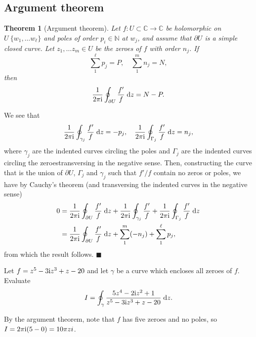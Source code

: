 \documentclass[letter-paper]{tufte-book}
\newtheorem{theorem}{\color{pastel-blue}Theorem}[section]
\newenvironment{proof}[1][Proof]{\begin{trivlist}
\item[\hskip \labelsep {\bfseries #1}]}{\end{trivlist}}
\newenvironment{example}[1][Example]{\begin{trivlist}
\item[\hskip \labelsep {\bfseries #1}]}{\end{trivlist}}
\newcommand{\zi}{{\rm i}}
\newcommand{\qed}{\hfill$\blacksquare$}
\begin{document}
\subsection{Argument theorem}

\begin{theorem}[Argument theorem]
  Let $f: U \subset \mathbb{C} \to \mathbb{C}$ be holomorphic on $U \ \{w_1,
  \ldots w_\ell\}$ and poles of order $p_i\in\mathbb{N}$ at $w_j$, and assume
  that $\partial U$ is a simple closed curve. Let $z_1, \ldots z_m \in U$ be the zeroes of $f$ with order $n_j$. If
  \begin{equation*}
    \sum_1^{\ell} p_j = P, \quad \sum_1^m n_j = N,
  \end{equation*}
  then
  \begin{equation}
    \frac{1}{2\pi\zi} \oint_{\partial U} \frac{f'}{f}\; \mathrm{d}z = N - P.
  \end{equation}
\end{theorem}

\begin{proof}
  We see that
  \begin{equation*}
    \frac{1}{2\pi\zi}\oint_{\gamma_j} \frac{f'}{f}\; \mathrm{d}z = -p_j, \quad 
    \frac{1}{2\pi\zi}\oint_{\Gamma_j} \frac{f'}{f}\; \mathrm{d}z =  n_j,
  \end{equation*}
  where $\gamma_j$ are the indented curves circling the poles and $\Gamma_j$ are
  the indented curves circling the zeroestransversing in the negative sense. Then, constructing the
  curve that is the union of $\partial U$, $\Gamma_j$ and $\gamma_j$ such that
  $f'/f$ contain no zeros or poles, we have by Cauchy's theorem (and
  transversing the indented curves in the negative sense)
  \begin{align*}
    0 &= \frac{1}{2\pi\zi} \oint_{\partial U} \frac{f'}{f}\; \mathrm{d}z + \frac{1}{2\pi\zi}\oint_{\gamma_j} \frac{f'}{f} + \frac{1}{2\pi\zi}\oint_{\Gamma_j} \frac{f'}{f}\; \mathrm{d}z \\
      &= \frac{1}{2\pi\zi} \oint_{\partial U} \frac{f'}{f}\; \mathrm{d}z + \sum_1^m (-n_j) + \sum_1^\ell p_j,
  \end{align*}
  from which the result follows. \qed
\end{proof}

\begin{example}
  Let $f = z^5 - 3\zi z^3 + z - 20$ and let $\gamma$ be a curve which encloses
  all zeroes of $f$. Evaluate
  \begin{equation*}
    I = \oint_\gamma \frac{5z^4 - 2\zi z^2 + 1}{z^5 - 3\zi z^3 + z - 20}\; \mathrm{d}z.
  \end{equation*}
  
  By the argument theorem, note that $f$ has five zeroes and no poles, so $I =
  2\pi\zi(5-0) = 10\pi zi$.
\end{example}
\end{document}
